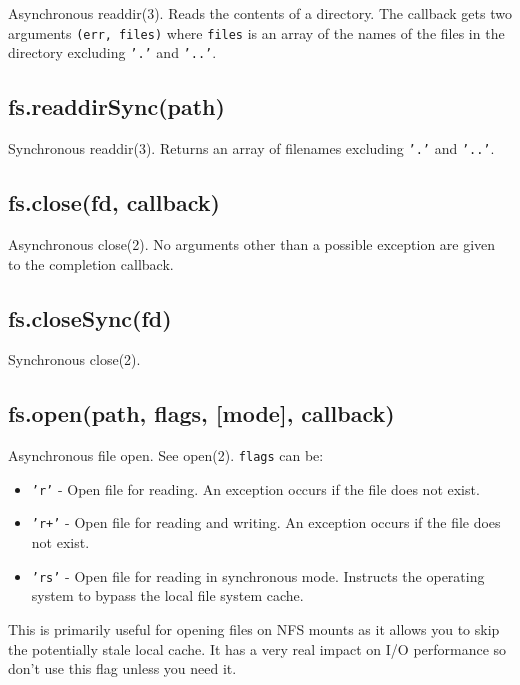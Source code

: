 Asynchronous readdir(3). Reads the contents of a directory. The callback
gets two arguments \texttt{(err, files)} where \texttt{files} is an
array of the names of the files in the directory excluding \texttt{'.'}
and \texttt{'..'}.

\subsection{fs.readdirSync(path)}\label{fs.readdirsyncpath}

Synchronous readdir(3). Returns an array of filenames excluding
\texttt{'.'} and \texttt{'..'}.

\subsection{fs.close(fd, callback)}\label{fs.closefd-callback}

Asynchronous close(2). No arguments other than a possible exception are
given to the completion callback.

\subsection{fs.closeSync(fd)}\label{fs.closesyncfd}

Synchronous close(2).

\subsection{fs.open(path, flags, {[}mode{]},
callback)}\label{fs.openpath-flags-mode-callback}

Asynchronous file open. See open(2). \texttt{flags} can be:

\begin{itemize}
\item
  \texttt{'r'} - Open file for reading. An exception occurs if the file
  does not exist.
\item
  \texttt{'r+'} - Open file for reading and writing. An exception occurs
  if the file does not exist.
\item
  \texttt{'rs'} - Open file for reading in synchronous mode. Instructs
  the operating system to bypass the local file system cache.
\end{itemize}

This is primarily useful for opening files on NFS mounts as it allows
you to skip the potentially stale local cache. It has a very real impact
on I/O performance so don't use this flag unless you need it.

